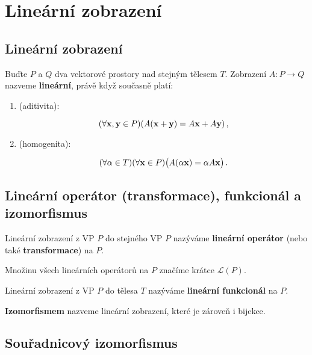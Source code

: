 \section{Lineární zobrazení}

\subsection*{Lineární zobrazení}

Buďte $P$ a $Q$ dva vektorové prostory nad stejným tělesem $T$. Zobrazení
$A:P\rightarrow Q$ nazveme \textbf{lineární}, právě když současně platí:

\begin{enumerate}
    \item (aditivita):

          \begin{equation*}
              (\forall \mathbf{x},\mathbf{y}\in P)( A(\mathbf{x}+\mathbf{y})=A\mathbf{x}+A\mathbf{y})\,,
          \end{equation*}
    \item (homogenita):

          \begin{equation*}
              (\forall \alpha\in T)( \forall \mathbf{x} \in P) \big(A(\alpha \mathbf{x})=\alpha A\mathbf{x}\big)\,.
          \end{equation*}
\end{enumerate}

\subsection*{Lineární operátor (transformace), funkcionál a izomorfismus}

Lineární zobrazení z VP $P$ do stejného VP $P$ nazýváme \textbf{lineární
    operátor} (nebo také \textbf{transformace}) na $P$.

\vspace{0.5em}

\noindent Množinu všech lineárních operátorů na $P$ značíme krátce $\mathcal L(P)$.

\vspace{0.5em}

\noindent Lineární zobrazení z VP $P$ do tělesa $T$ nazýváme \textbf{lineární funkcionál} na $P$.

\vspace{0.5em}

\noindent \textbf{Izomorfismem} nazveme lineární zobrazení, které je zároveň i bijekce.

\subsection*{Souřadnicový izomorfismus}

